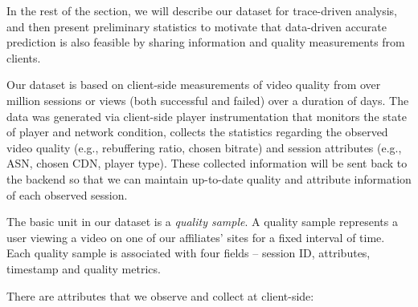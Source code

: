  In the rest of the section, we will describe our dataset for trace-driven analysis, and then present preliminary statistics to motivate that data-driven accurate prediction is also feasible by sharing information and quality measurements from clients. 

\label{subsec:dataset}

 Our dataset is based on client-side measurements of video quality from over \fillme million sessions or views (both successful and failed) over a duration of \fillme days. The data was generated via client-side player instrumentation that monitors the state of player and network condition, collects the statistics regarding the observed video quality (e.g., rebuffering ratio, chosen bitrate) and session attributes (e.g., ASN, chosen CDN, player type). These collected information will be sent back to the backend so that we can maintain up-to-date quality and attribute information of each observed session.

 The basic unit in our dataset is a {\it quality sample}. A quality sample represents a user viewing a video on one of our affiliates' sites for a fixed interval of time. Each quality sample is associated with four fields -- session ID, attributes, timestamp and quality metrics. 

 There are \fillme attributes that we observe and collect at client-side:

